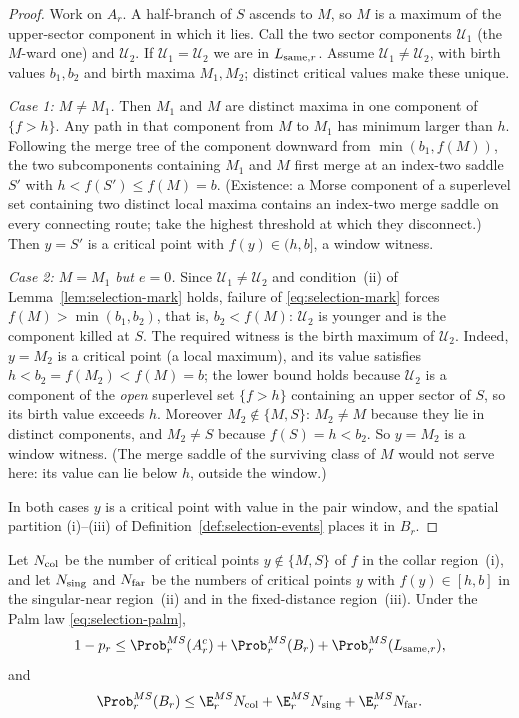 \begin{proof}
Work on $A_r$. A half-branch of $S$ ascends to $M$, so $M$ is a maximum of the upper-sector component in which it lies. Call the two sector components $\mathcal U_1$ (the $M$-ward one) and $\mathcal U_2$. If $\mathcal U_1=\mathcal U_2$ we are in $L_{{\rm same},r}$. Assume $\mathcal U_1\ne\mathcal U_2$, with birth values $b_1,b_2$ and birth maxima $M_1,M_2$; distinct critical values make these unique.

\emph{Case 1: $M\ne M_1$.} Then $M_1$ and $M$ are distinct maxima in one component of $\{f>h\}$. Any path in that component from $M$ to $M_1$ has minimum larger than $h$. Following the merge tree of the component downward from $\min(b_1,f(M))$, the two subcomponents containing $M_1$ and $M$ first merge at an index-two saddle $S'$ with $h<f(S')\le f(M)=b$. (Existence: a Morse component of a superlevel set containing two distinct local maxima contains an index-two merge saddle on every connecting route; take the highest threshold at which they disconnect.) Then $y=S'$ is a critical point with $f(y)\in(h,b]$, a window witness.

\emph{Case 2: $M=M_1$ but $e=0$.} Since $\mathcal U_1\ne\mathcal U_2$ and condition~(ii) of Lemma~\ref{lem:selection-mark} holds, failure of \eqref{eq:selection-mark} forces $f(M)>\min(b_1,b_2)$, that is, $b_2<f(M)$: $\mathcal U_2$ is younger and is the component killed at $S$. The required witness is the birth maximum of $\mathcal U_2$. Indeed, $y=M_2$ is a critical point (a local maximum), and its value satisfies $h<b_2=f(M_2)<f(M)=b$; the lower bound holds because $\mathcal U_2$ is a component of the \emph{open} superlevel set $\{f>h\}$ containing an upper sector of $S$, so its birth value exceeds $h$. Moreover $M_2\notin\{M,S\}$: $M_2\ne M$ because they lie in distinct components, and $M_2\ne S$ because $f(S)=h<b_2$. So $y=M_2$ is a window witness. (The merge saddle of the surviving class of $M$ would not serve here: its value can lie below $h$, outside the window.)

In both cases $y$ is a critical point with value in the pair window, and the spatial partition (i)--(iii) of Definition~\ref{def:selection-events} places it in $B_r$.
\end{proof}

\begin{corollary}\label{cor:selection-reduction}
Let $N_{\rm col}$ be the number of critical points $y\notin\{M,S\}$ of $f$ in the collar region~(i), and let $N_{\rm sing}$ and $N_{\rm far}$ be the numbers of critical points $y$ with $f(y)\in[h,b]$ in the singular-near region~(ii) and in the fixed-distance region~(iii). Under the Palm law \eqref{eq:selection-palm},
\begin{equation}\label{eq:selection-reduction}
1-p_r\le\Prob^{MS}_r(A_r^c)+\Prob^{MS}_r(B_r)+\Prob^{MS}_r(L_{{\rm same},r}),
\end{equation}
and
\begin{equation}\label{eq:selection-markov}
\Prob^{MS}_r(B_r)\le\E^{MS}_rN_{\rm col}+\E^{MS}_rN_{\rm sing}+\E^{MS}_rN_{\rm far}.
\end{equation}
\end{corollary}

